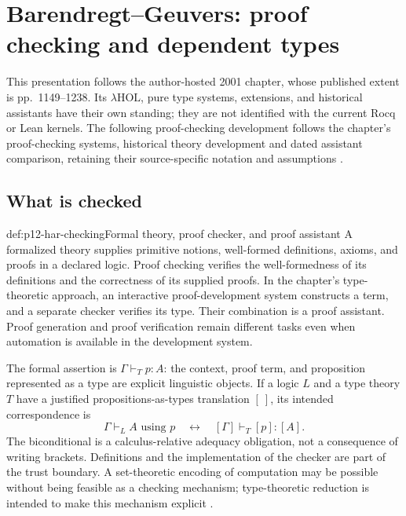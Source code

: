 \section{Barendregt--Geuvers: proof checking and dependent types}
\label{sec:p12-har-types}

This presentation follows the author-hosted 2001 chapter, whose published
extent is pp.~1149--1238. Its \(\lambda\mathrm{HOL}\), pure type systems,
extensions, and historical assistants have their own standing; they are not
identified with the current Rocq or Lean kernels. The following proof-checking
development follows the chapter's proof-checking systems, historical
theory development and dated assistant comparison, retaining their
source-specific notation and assumptions
\cite[pp.~1151--1230]{BarendregtGeuvers2001}.

\subsection{What is checked}

\begin{hbdefinition}{def:p12-har-checking}{Formal theory, proof checker, and proof assistant}
A formalized theory supplies primitive notions, well-formed definitions,
axioms, and proofs in a declared logic. Proof checking verifies the
well-formedness of its definitions and the correctness of its supplied
proofs. In the chapter's type-theoretic approach, an interactive
proof-development system constructs a term, and a separate checker verifies
its type. Their combination is a proof assistant. Proof generation and proof
verification remain different tasks even when automation is available in the
development system.

The formal assertion is \(\Gamma\vdash_T p:A\): the context, proof term,
and proposition represented as a type are explicit linguistic objects.
If a logic \(L\) and a type theory \(T\) have a justified
propositions-as-types translation \([\ ]\), its intended correspondence is
\[
 \Gamma\vdash_L A\text{ using }p
 \quad\longleftrightarrow\quad
 [\Gamma]\vdash_T[p]:[A].
\]
The biconditional is a calculus-relative adequacy obligation, not a
consequence of writing brackets. Definitions and the implementation of the
checker are part of the trust boundary. A set-theoretic encoding of
computation may be possible without being feasible as a checking mechanism;
type-theoretic reduction is intended to make this mechanism explicit
\cite[pp.~1151--1154]{BarendregtGeuvers2001}.
\end{hbdefinition}

